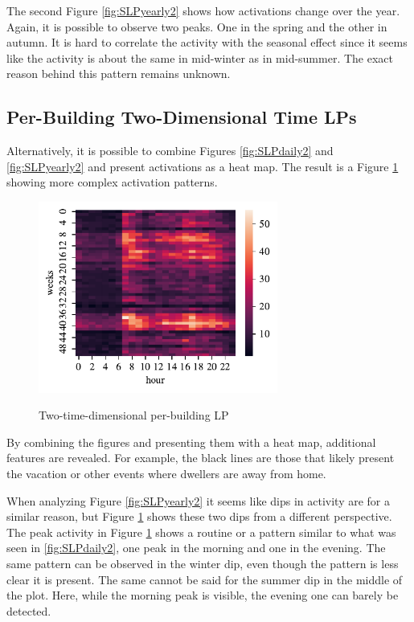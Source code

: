 The second Figure \ref{fig:SLPyearly2} shows how activations change over the year.  
Again, it is possible to observe two peaks.
One in the spring and the other in autumn. 
It is hard to correlate the activity with the seasonal effect since it seems like the activity is about the same in mid-winter as in mid-summer. 
The exact reason behind this pattern remains unknown.

\subsection{Per-Building Two-Dimensional Time LPs}
\label{ssec:per_building_two_time_dim}
Alternatively, it is possible to combine Figures \ref{fig:SLPdaily2} and \ref{fig:SLPyearly2} and present activations as a heat map.
The result is a Figure \ref{fig:SLPHMyearly2} showing more complex activation patterns.

\begin{figure}[H]
	\centering
	\caption{Two-time-dimensional per-building LP}
	\includegraphics[width=0.7\textwidth]{../Figures/LPS/SLPHMyearly2.pdf}
	\label{fig:SLPHMyearly2}
\end{figure}


By combining the figures and presenting them with a heat map, additional features are revealed.
For example, the black lines are those that likely present the vacation or other events where dwellers are away from home.

When analyzing Figure \ref{fig:SLPyearly2} it seems like dips in activity are for a similar reason, but Figure \ref{fig:SLPHMyearly2} shows these two dips from a different perspective.
The peak activity in Figure \ref{fig:SLPHMyearly2} shows a routine or a pattern similar to what was seen in \ref{fig:SLPdaily2}, one peak in the morning and one in the evening. 
The same pattern can be observed in the winter dip, even though the pattern is less clear it is present.
The same cannot be said for the summer dip in the middle of the plot. 
Here, while the morning peak is visible, the evening one can barely be detected.

